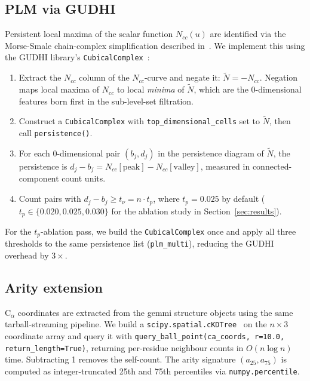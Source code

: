\subsection{PLM via GUDHI}
\label{sec:methods_plm}

Persistent local maxima of the scalar function $N_{cc}(u)$ are identified
via the Morse-Smale chain-complex simplification described
in~\cite{cazals2025alphafold}.
We implement this using the GUDHI library's
\texttt{CubicalComplex}~\cite{gudhi2015}:

\begin{enumerate}
  \item Extract the $N_{cc}$ column of the $N_{cc}$-curve and negate it:
        $\widetilde{N} = -N_{cc}$.
        Negation maps local maxima of $N_{cc}$ to local \emph{minima} of
        $\widetilde{N}$, which are the 0-dimensional features born first in
        the sub-level-set filtration.

  \item Construct a \texttt{CubicalComplex} with
        \texttt{top\_dimensional\_cells} set to $\widetilde{N}$,
        then call \texttt{persistence()}.

  \item For each 0-dimensional pair $(b_j, d_j)$ in the persistence
        diagram of $\widetilde{N}$, the persistence is
        $d_j - b_j = N_{cc}[\text{peak}] - N_{cc}[\text{valley}]$,
        measured in connected-component count units.

  \item Count pairs with $d_j - b_j \geq t_\nu = n \cdot t_p$, where
        $t_p = 0.025$ by default ($t_p \in \{0.020, 0.025, 0.030\}$ for
        the ablation study in Section~\ref{sec:results}).
\end{enumerate}

For the $t_p$-ablation pass, we build the \texttt{CubicalComplex} once and
apply all three thresholds to the same persistence list (\texttt{plm\_multi}),
reducing the GUDHI overhead by $3\times$.

\subsection{Arity extension}
\label{sec:methods_arity}

$\mathrm{C}_\alpha$ coordinates are extracted from the gemmi structure
objects using the same tarball-streaming pipeline.
We build a \texttt{scipy.spatial.cKDTree}~\cite{virtanen2020scipy} on the
$n\times 3$ coordinate array and query it with
\texttt{query\_ball\_point(ca\_coords, r=10.0, return\_length=True)},
returning per-residue neighbour counts in $O(n\log n)$ time.
Subtracting 1 removes the self-count.
The arity signature $(a_{25}, a_{75})$ is computed as integer-truncated
25th and 75th percentiles via \texttt{numpy.percentile}.

